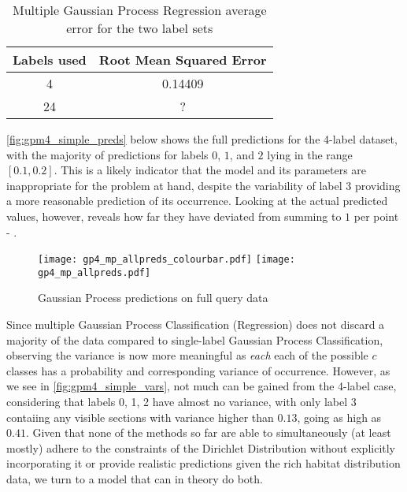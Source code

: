 \begin{table}[H]
    \centering
    \begin{tabular}{|c|c|}
        \hline
        Labels used & Root Mean Squared Error \\\hline
        4 & 0.14409\\
        24  & ? \\
        \hline
    \end{tabular}
    \label{table:gpmbasicresults}
    \caption{Multiple Gaussian Process Regression average error for the two label sets}
\end{table}

\autoref{fig:gpm4_simple_preds} below shows the full predictions for the 4-label dataset, with the majority of predictions for labels $0$, $1$, and $2$ lying in the range $[0.1, 0.2]$. This is a likely indicator that the model and its parameters are inappropriate for the problem at hand, despite the variability of label 3 providing a more reasonable prediction of its occurrence. Looking at the actual predicted values, however, reveals how far they have deviated from summing to $1$ per point - .


\begin{figure}[H]
    \centering
    \texttt{[image: gp4\_mp\_allpreds\_colourbar.pdf]}
    \texttt{[image: gp4\_mp\_allpreds.pdf]}
    \label{fig:gpm4_simple_preds}
    \caption{Gaussian Process predictions on full query data}
\end{figure}

Since multiple Gaussian Process Classification (Regression) does not discard a majority of the data compared to single-label Gaussian Process Classification, observing the variance is now more meaningful as \textit{each } each of the possible $c$ classes has a probability and corresponding variance of occurrence. However, as we see in \autoref{fig:gpm4_simple_vars}, not much can be gained from the 4-label case, considering that labels 0, 1, 2 have almost no variance, with only label 3 contaiing any visible sections with variance higher than $0.13$, going as high as $0.41$. Given that none of the methods so far are able to simultaneously (at least mostly) adhere to the constraints of the Dirichlet Distribution without explicitly incorporating it or provide realistic predictions given the rich habitat distribution data, we turn to a model that can in theory do both.

